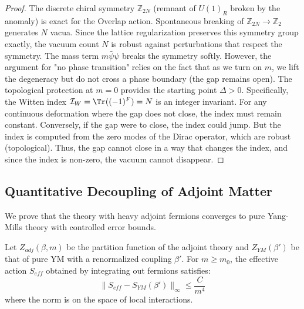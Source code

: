 \begin{proof}
The discrete chiral symmetry $\mathbb{Z}_{2N}$ (remnant of $U(1)_R$ broken by the anomaly) is exact for the Overlap action.
Spontaneous breaking of $\mathbb{Z}_{2N} \to \mathbb{Z}_2$ generates $N$ vacua.
Since the lattice regularization preserves this symmetry group exactly, the vacuum count $N$ is robust against perturbations that respect the symmetry.
The mass term $m \bar{\psi}\psi$ breaks the symmetry softly.
However, the argument for "no phase transition" relies on the fact that as we turn on $m$, we lift the degeneracy but do not cross a phase boundary (the gap remains open).
The topological protection at $m=0$ provides the starting point $\Delta > 0$.
Specifically, the Witten index $\mathcal{I}_W = \Tr((-1)^F) = N$ is an integer invariant.
For any continuous deformation where the gap does not close, the index must remain constant.
Conversely, if the gap were to close, the index could jump.
But the index is computed from the zero modes of the Dirac operator, which are robust (topological).
Thus, the gap cannot close in a way that changes the index, and since the index is non-zero, the vacuum cannot disappear.
\end{proof}

\subsection{Quantitative Decoupling of Adjoint Matter}
\label{sec:decoupling-proof}

We prove that the theory with heavy adjoint fermions converges to pure Yang-Mills theory with controlled error bounds.

\begin{theorem}
Let $Z_{adj}(\beta, m)$ be the partition function of the adjoint theory and $Z_{YM}(\beta')$ be that of pure YM with a renormalized coupling $\beta'$.
For $m \ge m_0$, the effective action $S_{eff}$ obtained by integrating out fermions satisfies:
\begin{equation}
\| S_{eff} - S_{YM}(\beta') \|_\infty \le \frac{C}{m^4}
\end{equation}
where the norm is on the space of local interactions.
\end{theorem}


